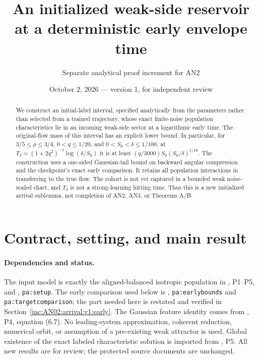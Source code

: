 \documentclass[11pt]{article}
\title{An initialized weak-side reservoir\\at a deterministic early envelope time}
\author{Separate analytical proof increment for AN2}
\date{October 2, 2026 --- version 1, for independent review}
\numberwithin{equation}{section}
\theoremstyle{remark}
\begin{document}
\maketitle

\begin{abstract}
We construct an initial-label interval, specified analytically from the
parameters rather than selected from a trained trajectory, whose exact
finite-noise population characteristics lie in an incoming weak-side sector
at a logarithmic early time. The original-flow mass of this interval has an
explicit lower bound. In particular, for
$3/5\le\rho\le3/4$, $0<q\le1/20$, and
$0<S_0<\delta\le1/100$, at
$T_\delta=(1+2q^2)^{-1}\log(\delta/S_0)$ it is at least
$(q/3000)S_0(S_0/\delta)^{1/16}$.
The construction uses a one-sided Gaussian-tail bound on backward angular
compression and the checkpoint's exact early comparison. It retains all
population interactions in transferring to the true flow.
The cohort is not yet captured in a bounded weak noise-scaled chart, and
$T_\delta$ is not a strong-learning hitting time. Thus this is a new
initialized arrival sublemma, not completion of AN2, AN3, or Theorems A/B.
\end{abstract}

\section{Contract, setting, and main result}
\label{inc:AN02:arrival:v1:contract}

\paragraph{Dependencies and status.}
The input model is exactly the aligned-balanced isotropic population in
\cite{F}, P1--P5, and \cite{P}, \texttt{pa:setup}.
The early comparison used below is \cite{P},
\texttt{pa:earlybounds} and \texttt{pa:targetcomparison}; the part needed
here is restated and verified in Section~\ref{inc:AN02:arrival:v1:early}.
The Gaussian feature identity comes from \cite{F}, P4, equation (6.7).
No leading-system approximation, coherent reduction, numerical orbit, or
assumption of a pre-existing weak attractor is used. Global existence of
the exact labeled characteristic solution is imported from \cite{F}, P5.
All new results are for review; the protected source documents are unchanged.
\end{document}
